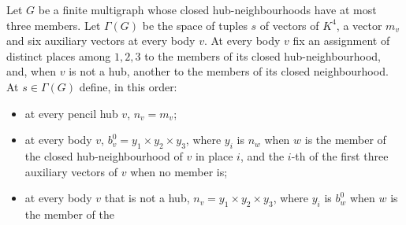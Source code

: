 \begin{lemma}
  \label{lem:pencil-d-steer}
  \leanok
  Let $G$ be a finite multigraph whose closed hub-neighbourhoods have
  at most three members. Let $\Gamma(G)$ be the space of tuples $s$
  of vectors of $K^4$, a vector $m_v$ and six auxiliary vectors at every
  body $v$. At every body $v$ fix an assignment of distinct places among
  $1, 2, 3$ to the members of its closed hub-neighbourhood, and, when $v$
  is not a hub, another to the members of its closed neighbourhood. At
  $s \in \Gamma(G)$ define, in this order:
  \begin{itemize}
    \item at every pencil hub $v$, $n_v = m_v$;
    \item at every body $v$, $b^0_v = y_1 \times y_2 \times y_3$, where
      $y_i$ is $n_w$ when $w$ is the member of the closed
      hub-neighbourhood of $v$ in place $i$, and the $i$-th of the first
      three auxiliary vectors of $v$ when no member is;
    \item at every body $v$ that is not a hub, $n_v = y_1 \times y_2
      \times y_3$, where $y_i$ is $b^0_w$ when $w$ is the member of the

\end{itemize}
\end{lemma}
